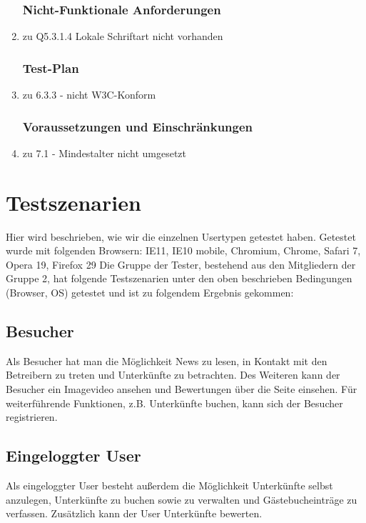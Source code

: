 \documentclass[10pt,a4paper]{scrartcl}
\begin{document}
\begin{enumerate}
\subsubsection{Nicht-Funktionale Anforderungen}
\item zu Q5.3.1.4 Lokale Schriftart nicht vorhanden

\subsubsection{Test-Plan}
\item zu 6.3.3 - nicht W3C-Konform

\subsubsection{Voraussetzungen und Einschränkungen}
\item zu 7.1 - Mindestalter nicht umgesetzt

\end{enumerate}

\section{Testszenarien}

Hier wird beschrieben, wie wir die einzelnen Usertypen getestet haben. 
\newline Getestet wurde mit folgenden Browsern:
IE11, IE10 mobile, Chromium, Chrome, Safari 7, Opera 19, Firefox 29
\newline\newline Die Gruppe der Tester, bestehend aus den Mitgliedern der Gruppe 2, hat folgende Testszenarien unter den oben beschrieben Bedingungen (Browser, OS) getestet und ist zu folgendem Ergebnis gekommen:

\subsection{Besucher}
Als Besucher hat man die Möglichkeit News zu lesen, in Kontakt mit den Betreibern zu treten und Unterkünfte zu betrachten. Des Weiteren kann der Besucher ein Imagevideo ansehen und Bewertungen über die Seite einsehen. Für weiterführende Funktionen, z.B. Unterkünfte buchen, kann sich der Besucher registrieren.

\subsection{Eingeloggter User}
Als eingeloggter User besteht außerdem die Möglichkeit Unterkünfte selbst anzulegen, Unterkünfte zu buchen sowie zu verwalten und Gästebucheinträge zu verfassen. Zusätzlich kann der User Unterkünfte bewerten. 
\end{document}
